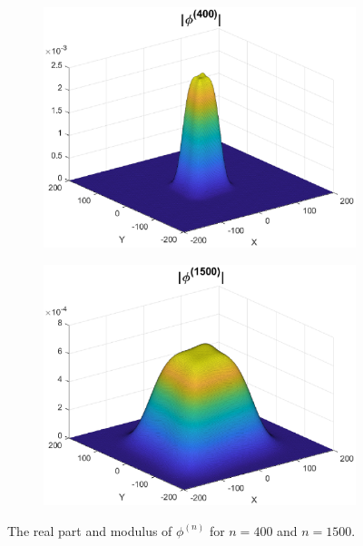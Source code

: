\documentclass[11pt, letter]{book}
\begin{document}
\begin{figure}[!htb]
\begin{subfigure}{0.49\textwidth}
    \includegraphics[scale=0.52]{Abs_400.eps}
    \end{subfigure}
    \begin{subfigure}{0.49\textwidth}
    \includegraphics[scale=0.52]{Abs_1500.eps}
    \end{subfigure}
    \caption{The real part and modulus of $\phi^{(n)}$ for $n = 400$ and $n = 1500$.}
    \label{fig:Interesting_Example}
\end{figure}
\end{document}
